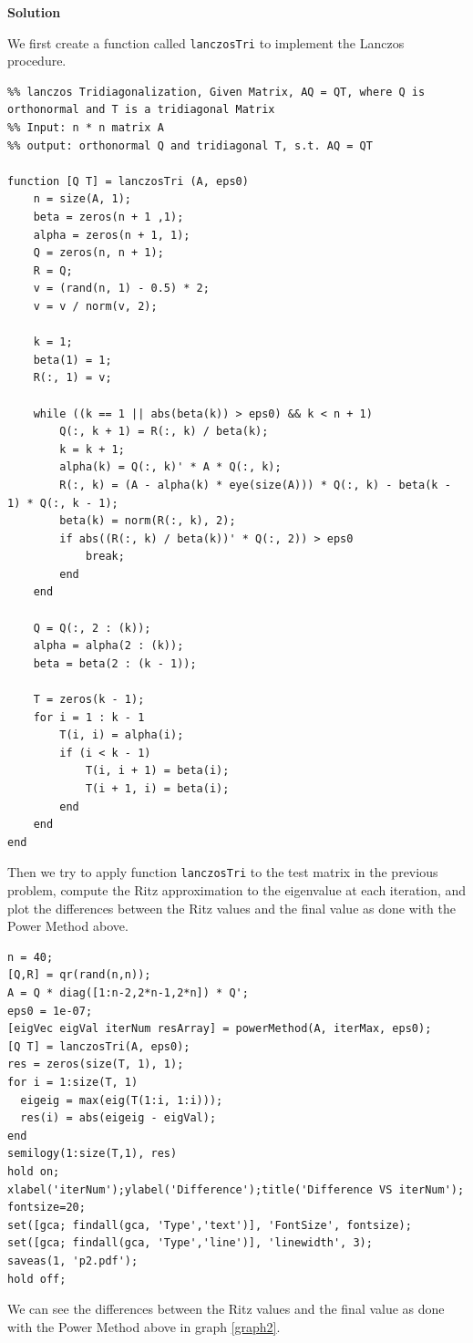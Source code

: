 \documentclass[12pt,oneside,a4paper]{article}
\newcommand{\solution}
{
    \vspace{15pt}
    \noindent\ignorespaces\textbf{\large Solution}\par
}
\newcommand{\m}[1]{\texttt{{#1}}}
\begin{document}
\solution
We first create a function called \m{lanczosTri} to implement the Lanczos procedure.
\begin{lstlisting}
%% lanczos Tridiagonalization, Given Matrix, AQ = QT, where Q is orthonormal and T is a tridiagonal Matrix
%% Input: n * n matrix A
%% output: orthonormal Q and tridiagonal T, s.t. AQ = QT

function [Q T] = lanczosTri (A, eps0)
    n = size(A, 1);
    beta = zeros(n + 1 ,1);
    alpha = zeros(n + 1, 1);
    Q = zeros(n, n + 1);
    R = Q;
    v = (rand(n, 1) - 0.5) * 2;
    v = v / norm(v, 2);

    k = 1;
    beta(1) = 1;
    R(:, 1) = v;

    while ((k == 1 || abs(beta(k)) > eps0) && k < n + 1)
        Q(:, k + 1) = R(:, k) / beta(k);
        k = k + 1;
        alpha(k) = Q(:, k)' * A * Q(:, k);
        R(:, k) = (A - alpha(k) * eye(size(A))) * Q(:, k) - beta(k - 1) * Q(:, k - 1);
        beta(k) = norm(R(:, k), 2);
        if abs((R(:, k) / beta(k))' * Q(:, 2)) > eps0
            break;
        end
    end

    Q = Q(:, 2 : (k));
    alpha = alpha(2 : (k));
    beta = beta(2 : (k - 1));
    
    T = zeros(k - 1);
    for i = 1 : k - 1
        T(i, i) = alpha(i);
        if (i < k - 1)
            T(i, i + 1) = beta(i);
            T(i + 1, i) = beta(i);
        end
    end
end
\end{lstlisting}

Then we try to apply function \m{lanczosTri} to the test matrix in the previous problem, compute the Ritz approximation to the eigenvalue at each iteration, and plot the differences between the Ritz values and the final value as done with the Power Method above.

\begin{lstlisting}
n = 40;
[Q,R] = qr(rand(n,n));
A = Q * diag([1:n-2,2*n-1,2*n]) * Q';
eps0 = 1e-07;
[eigVec eigVal iterNum resArray] = powerMethod(A, iterMax, eps0);
[Q T] = lanczosTri(A, eps0);
res = zeros(size(T, 1), 1);
for i = 1:size(T, 1)
  eigeig = max(eig(T(1:i, 1:i)));
  res(i) = abs(eigeig - eigVal);
end
semilogy(1:size(T,1), res)
hold on;
xlabel('iterNum');ylabel('Difference');title('Difference VS iterNum');
fontsize=20;
set([gca; findall(gca, 'Type','text')], 'FontSize', fontsize);
set([gca; findall(gca, 'Type','line')], 'linewidth', 3);
saveas(1, 'p2.pdf');
hold off;
\end{lstlisting}
\clearpage
We can see the differences between the Ritz values and the final value as done with the Power Method above in graph \ref{graph2}.
\end{document}
